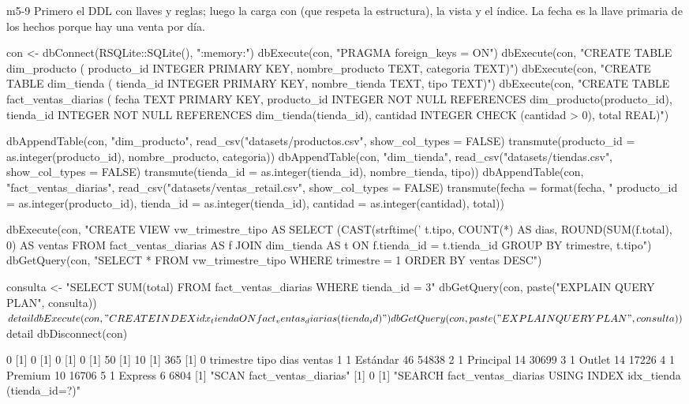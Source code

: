 \begin{solucion}{m5-9}
Primero el DDL con llaves y reglas; luego la carga con
 (que respeta la estructura), la vista y el
índice. La fecha es la llave primaria de los hechos porque hay una venta
por día.

\begin{rcode}
con <- dbConnect(RSQLite::SQLite(), ":memory:")
dbExecute(con, "PRAGMA foreign_keys = ON")
dbExecute(con, "CREATE TABLE dim_producto (
  producto_id INTEGER PRIMARY KEY, nombre_producto TEXT, categoria TEXT)")
dbExecute(con, "CREATE TABLE dim_tienda (
  tienda_id INTEGER PRIMARY KEY, nombre_tienda TEXT, tipo TEXT)")
dbExecute(con, "CREATE TABLE fact_ventas_diarias (
  fecha TEXT PRIMARY KEY,
  producto_id INTEGER NOT NULL REFERENCES dim_producto(producto_id),
  tienda_id   INTEGER NOT NULL REFERENCES dim_tienda(tienda_id),
  cantidad    INTEGER CHECK (cantidad > 0),
  total REAL)")

dbAppendTable(con, "dim_producto",
  read_csv("datasets/productos.csv", show_col_types = FALSE) %
    transmute(producto_id = as.integer(producto_id), nombre_producto,
              categoria))
dbAppendTable(con, "dim_tienda",
  read_csv("datasets/tiendas.csv", show_col_types = FALSE) %
    transmute(tienda_id = as.integer(tienda_id), nombre_tienda, tipo))
dbAppendTable(con, "fact_ventas_diarias",
  read_csv("datasets/ventas_retail.csv", show_col_types = FALSE) %
    transmute(fecha = format(fecha, "%
              producto_id = as.integer(producto_id),
              tienda_id = as.integer(tienda_id),
              cantidad = as.integer(cantidad), total))

dbExecute(con, "CREATE VIEW vw_trimestre_tipo AS
  SELECT (CAST(strftime('%
         t.tipo, COUNT(*) AS dias, ROUND(SUM(f.total), 0) AS ventas
  FROM fact_ventas_diarias AS f
  JOIN dim_tienda AS t ON f.tienda_id = t.tienda_id
  GROUP BY trimestre, t.tipo")
dbGetQuery(con, "SELECT * FROM vw_trimestre_tipo
                 WHERE trimestre = 1 ORDER BY ventas DESC")

consulta <- "SELECT SUM(total) FROM fact_ventas_diarias WHERE tienda_id = 3"
dbGetQuery(con, paste("EXPLAIN QUERY PLAN", consulta))$detail
dbExecute(con, "CREATE INDEX idx_tienda ON fact_ventas_diarias(tienda_id)")
dbGetQuery(con, paste("EXPLAIN QUERY PLAN", consulta))$detail
dbDisconnect(con)
\end{rcode}

\begin{rsalida}
[1] 0
[1] 0
[1] 0
[1] 0
[1] 50
[1] 10
[1] 365
[1] 0
  trimestre      tipo dias ventas
1         1  Estándar   46  54838
2         1 Principal   14  30699
3         1    Outlet   14  17226
4         1   Premium   10  16706
5         1   Express    6   6804
[1] "SCAN fact_ventas_diarias"
[1] 0
[1] "SEARCH fact_ventas_diarias USING INDEX idx_tienda (tienda_id=?)"
\end{rsalida}


\end{solucion}
